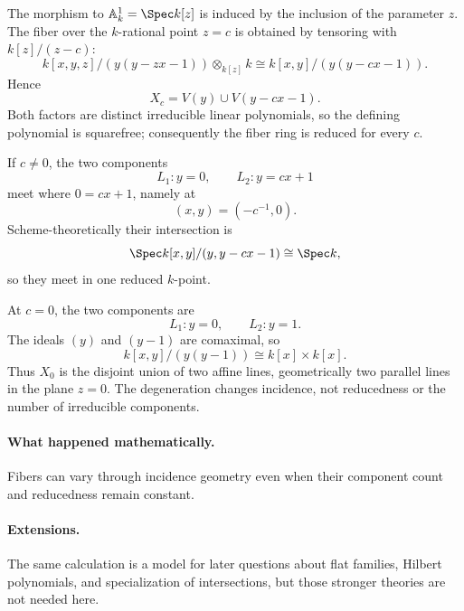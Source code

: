 \begin{solution}
The morphism to \(\mathbb A^1_k=\Spec k[z]\) is induced by the inclusion of the parameter \(z\).  The fiber over the \(k\)-rational point \(z=c\) is obtained by tensoring with \(k[z]/(z-c)\):
\[
k[x,y,z]/(y(y-zx-1))\otimes_{k[z]} k
\cong
k[x,y]/(y(y-cx-1)).
\]
Hence
\[
X_c=V(y)\cup V(y-cx-1).
\]
Both factors are distinct irreducible linear polynomials, so the defining polynomial is squarefree; consequently the fiber ring is reduced for every \(c\).

If \(c\ne0\), the two components
\[
L_1: y=0,\qquad L_2:y=cx+1
\]
meet where \(0=cx+1\), namely at
\[
(x,y)=(-c^{-1},0).
\]
Scheme-theoretically their intersection is
\[
\Spec k[x,y]/(y,y-cx-1)
\cong
\Spec k,
\]
so they meet in one reduced \(k\)-point.

At \(c=0\), the two components are
\[
L_1:y=0,\qquad L_2:y=1.
\]
The ideals \((y)\) and \((y-1)\) are comaximal, so
\[
k[x,y]/(y(y-1))
\cong
k[x]\times k[x].
\]
Thus \(X_0\) is the disjoint union of two affine lines, geometrically two parallel lines in the plane \(z=0\).  The degeneration changes incidence, not reducedness or the number of irreducible components.
\end{solution}

\paragraph{What happened mathematically.}
Fibers can vary through incidence geometry even when their component count and reducedness remain constant.

\paragraph{Extensions.}
The same calculation is a model for later questions about flat families, Hilbert polynomials, and specialization of intersections, but those stronger theories are not needed here.
\fi
